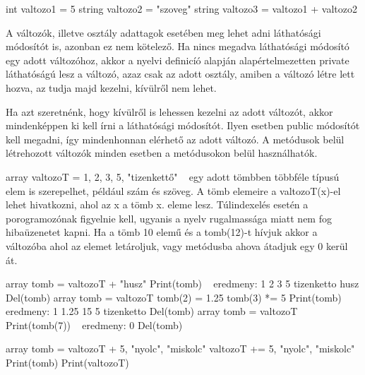 \begin{cpp}
int valtozo1 = 5
string valtozo2 = "szoveg"
string valtozo3 = valtozo1 + valtozo2
\end{cpp}


A változók, illetve osztály adattagok esetében meg lehet adni láthatósági módosítót is, azonban ez nem kötelező. Ha nincs megadva láthatósági módosító egy adott változóhoz, akkor a nyelvi definicíó alapján alapértelmezetten private láthatóságú lesz a változó, azaz csak az adott osztály, amiben a változó létre lett hozva, az tudja majd kezelni, kívülről nem lehet.

Ha azt szeretnénk, hogy kívülről is lehessen kezelni az adott változót, akkor mindenképpen ki kell írni a láthatósági módosítót. Ilyen esetben public módosítót kell megadni, így mindenhonnan elérhető az adott változó. A metódusok belül létrehozott változók minden esetben a metódusokon belül használhatók.

array valtozoT = {1, 2, 3, 5, "tizenkettő"} ~ egy adott tömbben többféle típusú elem is szerepelhet, például szám és szöveg. A tömb elemeire a valtozoT(x)-el lehet hivatkozni, ahol az x a tömb x. eleme lesz.
Túlindexelés esetén a porogramozónak figyelnie kell, ugyanis a nyelv rugalmassága miatt nem fog hibaüzenetet kapni. Ha a tömb 10 elemű és a tomb(12)-t hívjuk akkor a változóba ahol az elemet letároljuk, vagy metódusba ahova átadjuk egy 0 kerül át.

\begin{cpp}
array tomb = valtozoT + "husz"
Print(tomb) ~ eredmeny: 1 2 3 5 tizenketto husz
Del(tomb)
array tomb = valtozoT
tomb(2) = 1.25
tomb(3) *= 5
Print(tomb) ~ eredmeny: 1 1.25 15 5 tizenketto
Del(tomb)
array tomb = valtozoT
Print(tomb(7)) ~ eredmeny: 0
Del(tomb)

array tomb = valtozoT + {5, "nyolc", "miskolc"}
valtozoT += {5, "nyolc", "miskolc"}
Print(tomb)
Print(valtozoT)
\end{cpp}


